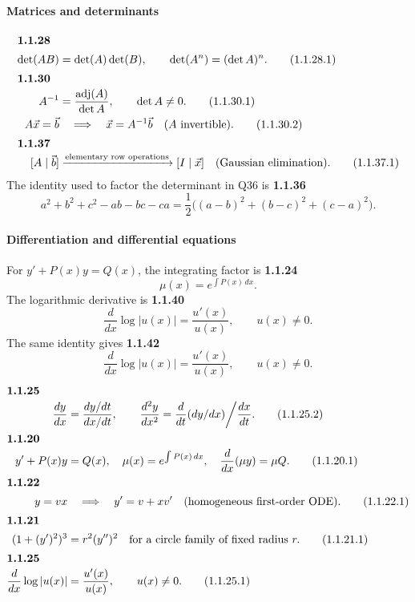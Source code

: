 \paragraph*{Matrices and determinants}
\begin{align}\intertext{\textbf{1.1.28}}
\det(AB)&=\det(A)\det(B),\qquad \det(A^n)=(\det A)^n. \tag{1.1.28.1}\label{eq:det-power}\\
\intertext{\textbf{1.1.30}}
A^{-1}&=\frac{\operatorname{adj}(A)}{\det A},\qquad \det A\ne0. \tag{1.1.30.1}\label{eq:inverse-matrix}\\
A\vec x=\vec b&\quad\Longrightarrow\quad \vec x=A^{-1}\vec b\quad(A\text{ invertible}). \tag{1.1.30.2}\\
\intertext{\textbf{1.1.37}}
[A\mid \vec b]&\xrightarrow{\text{elementary row operations}}[I\mid\vec x]\quad\text{(Gaussian elimination)}. \tag{1.1.37.1}\label{eq:gaussian-elimination}
\end{align}
The identity used to factor the determinant in Q36 is
\noindent\textbf{1.1.36}\quad
\[
a^2+b^2+c^2-ab-bc-ca=\frac12\bigl((a-b)^2+(b-c)^2+(c-a)^2\bigr).\tag{1.1.36.1}\label{eq:sum-squares}
\]

\paragraph*{Differentiation and differential equations}
For $y' + P(x)y=Q(x)$, the integrating factor is
\noindent\textbf{1.1.24}\quad
\begin{equation}
\mu(x)=e^{\int P(x)\,dx}.\tag{1.1.24.1}\label{eq:if-24}
\end{equation}
The logarithmic derivative is
\noindent\textbf{1.1.40}\quad
\begin{equation}
\frac{d}{dx}\log|u(x)|=\frac{u'(x)}{u(x)},\qquad u(x)\ne0.\tag{1.1.40.1}\label{eq:log-derivative-40}
\end{equation}
The same identity gives
\noindent\textbf{1.1.42}\quad
\begin{equation}
\frac{d}{dx}\log|u(x)|=\frac{u'(x)}{u(x)},\qquad u(x)\ne0.\tag{1.1.42.1}\label{eq:log-derivative-42}
\end{equation}
\begin{align}\intertext{\textbf{1.1.25}}
\frac{dy}{dx}&=\frac{dy/dt}{dx/dt},\qquad \frac{d^2y}{dx^2}=\frac{d}{dt}(dy/dx)\bigg/\frac{dx}{dt}. \tag{1.1.25.2}\\
\intertext{\textbf{1.1.20}}
y'+P(x)y&=Q(x),\quad \mu(x)=e^{\int P(x)\,dx},\quad \frac{d}{dx}(\mu y)=\mu Q. \tag{1.1.20.1}\\
\intertext{\textbf{1.1.22}}
y=vx&\quad\Longrightarrow\quad y'=v+xv'\quad\text{(homogeneous first-order ODE)}. \tag{1.1.22.1}\label{eq:homogeneous-substitution}\\
\intertext{\textbf{1.1.21}}
(1+(y')^2)^3&=r^2(y'')^2\quad\text{for a circle family of fixed radius }r. \tag{1.1.21.1}\label{eq:circle-family}\\
\intertext{\textbf{1.1.25}}
\frac{d}{dx}\log|u(x)|&=\frac{u'(x)}{u(x)},\qquad u(x)\ne0. \tag{1.1.25.1}
\end{align}

